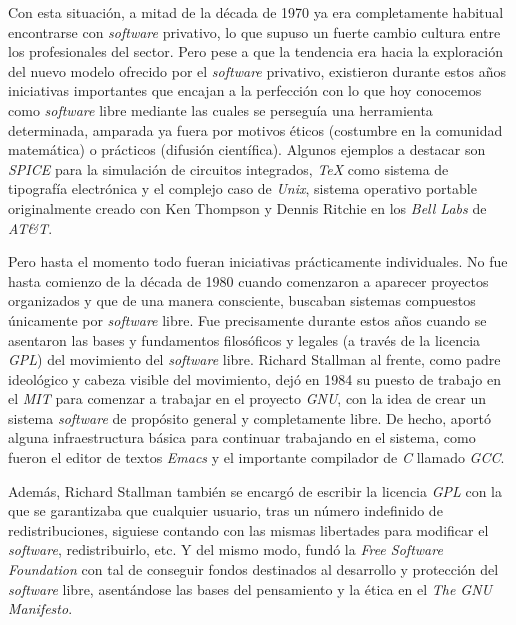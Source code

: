 Con esta situación, a mitad de la década de 1970 ya era completamente habitual
encontrarse con \textit{software} privativo, lo que supuso un fuerte cambio
cultura entre los profesionales del sector. Pero pese a que la tendencia era
hacia la exploración del nuevo modelo ofrecido por el \textit{software}
privativo, existieron durante estos años iniciativas importantes que encajan a
la perfección con lo que hoy conocemos como \textit{software} libre mediante las
cuales se perseguía una herramienta determinada, amparada ya fuera por motivos
éticos (costumbre en la comunidad matemática) o prácticos (difusión científica).
Algunos ejemplos a destacar son \textit{SPICE} para la simulación de circuitos
integrados, \textit{TeX} como sistema de tipografía electrónica y el complejo
caso de \textit{Unix}, sistema operativo portable originalmente creado con Ken
Thompson y Dennis Ritchie en los \textit{Bell Labs} de \textit{AT&T}.

Pero hasta el momento todo fueran iniciativas prácticamente individuales. No
fue hasta comienzo de la década de 1980 cuando comenzaron a aparecer proyectos
organizados y que de una manera consciente, buscaban sistemas compuestos
únicamente por \textit{software} libre. Fue precisamente durante estos años
cuando se asentaron las bases y fundamentos filosóficos y legales (a través de
la licencia \textit{GPL}) del movimiento del \textit{software} libre. Richard
Stallman al frente, como padre ideológico y cabeza visible del movimiento, dejó
en 1984 su puesto de trabajo en el \textit{MIT} para comenzar a trabajar en el
proyecto \textit{GNU}, con la idea de crear un sistema \textit{software} de
propósito general y completamente libre. De hecho, aportó alguna infraestructura
básica para continuar trabajando en el sistema, como fueron el editor de textos
\textit{Emacs} y el importante compilador de \textit{C} llamado \textit{GCC}.

Además, Richard Stallman también se encargó de escribir la licencia \textit{GPL}
con la que se garantizaba que cualquier usuario, tras un número indefinido de
redistribuciones, siguiese contando con las mismas libertades para modificar el
\textit{software}, redistribuirlo, etc. Y del mismo modo, fundó la \textit{Free
Software Foundation} con tal de conseguir fondos destinados al desarrollo y
protección del \textit{software} libre, asentándose las bases del pensamiento y
la ética en el \textit{The GNU Manifesto}.

